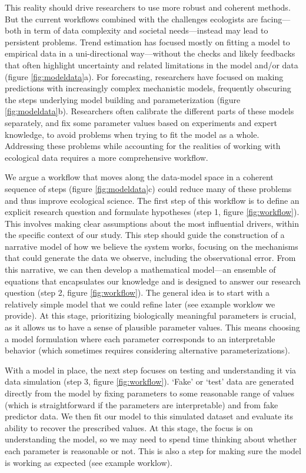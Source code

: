 \documentclass[11pt]{article}
\begin{document}
This reality should drive researchers to use more robust and coherent methods. But the current workflows combined with the challenges ecologists are facing---both in term of data complexity and societal needs---instead may lead to persistent problems.
Trend estimation has focused mostly on fitting a model to empirical data in a uni-directional way---without the checks and likely feedbacks that often highlight uncertainty and related limitations in the model and/or data (figure \ref{fig:modeldata}a). For forecasting, researchers have focused on making predictions with increasingly complex mechanistic models, frequently obscuring the steps underlying model building and parameterization (figure \ref{fig:modeldata}b). Researchers often calibrate the different parts of these models separately, and fix some parameter values based on experiments and expert knowledge, to avoid problems when trying to fit the model as a whole.
Addressing these problems while accounting for the realities of working with ecological data requires a more comprehensive workflow.

We argue a workflow that moves along the data-model space in a coherent sequence of steps (figure \ref{fig:modeldata}c) could reduce many of these problems and thus improve ecological science.
The first step of this workflow is to define an explicit research question and formulate hypotheses (step 1, figure \ref{fig:workflow}). This involves making clear assumptions about the most influential drivers, within the specific context of our study. This step should guide the construction of a narrative model of how we believe the system works, focusing on the mechanisms that could generate the data we observe, including the observational error. 
From this narrative, we can then develop a mathematical model---an ensemble of equations that encapsulates our knowledge and is designed to answer our research question (step 2, figure \ref{fig:workflow}). The general idea is to start with a relatively simple model that we could refine later (see example worklow we provide). At this stage, prioritizing biologically meaningful parameters is crucial, as it allows us to have a sense of plausible parameter values. This means choosing a model formulation where each parameter corresponds to an interpretable behavior (which sometimes requires considering alternative parameterizations). 

With a model in place, the next step focuses on testing and understanding it via data simulation (step 3, figure \ref{fig:workflow}). `Fake' or `test' data are generated directly from the model by fixing parameters to some reasonable range of values (which is straightforward if the parameters are interpretable) and from fake predictor data. 
We then fit our model to this simulated dataset and evaluate its ability to recover the prescribed values. At this stage, the focus is on understanding the model, so we may need to spend time thinking about whether each parameter is reasonable or not. This is also a step for making sure the model is working as expected (see example worklow). 
\end{document}
